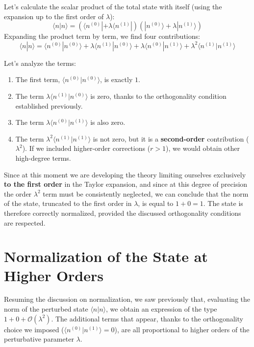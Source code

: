 Let's calculate the scalar product of the total state with itself (using the expansion up to the first order of $\lambda$):
\begin{equation}
\langle n | n \rangle = \left( \langle n^{(0)}| + \lambda \langle n^{(1)}| \right) \left( |n^{(0)}\rangle + \lambda |n^{(1)}\rangle \right)
\end{equation}
Expanding the product term by term, we find four contributions:
\begin{equation}
\langle n | n \rangle = \langle n^{(0)} | n^{(0)} \rangle + \lambda \langle n^{(1)} | n^{(0)} \rangle + \lambda \langle n^{(0)} | n^{(1)} \rangle + \lambda^2 \langle n^{(1)} | n^{(1)} \rangle
\end{equation}

Let's analyze the terms:
\begin{enumerate}
\item The first term, $\langle n^{(0)} \vert{} n^{(0)} \rangle$, is exactly $1$.
\item The term $\lambda \langle n^{(1)} \vert{} n^{(0)} \rangle$ is zero, thanks to the orthogonality condition established previously.
\item The term $\lambda \langle n^{(0)} \vert{} n^{(1)} \rangle$ is also zero.
\item The term $\lambda^2 \langle n^{(1)} \vert{} n^{(1)} \rangle$ is not zero, but it is a \textbf{second-order} contribution ($\lambda^2$). If we included higher-order corrections ($r>1$), we would obtain other high-degree terms.
\end{enumerate}

Since at this moment we are developing the theory limiting ourselves exclusively \textbf{to the first order} in the Taylor expansion, and since at this degree of precision the order $\lambda^2$ term must be consistently neglected, we can conclude that the norm of the state, truncated to the first order in $\lambda$, is equal to $1 + 0 = 1$. The state is therefore correctly normalized, provided the discussed orthogonality conditions are respected.
    

\section{Normalization of the State at Higher Orders}

Resuming the discussion on normalization, we saw previously that, evaluating the norm of the perturbed state $\langle n \vert{} n \rangle$, we obtain an expression of the type $1 + 0 + \mathcal{O}(\lambda^2)$.
The additional terms that appear, thanks to the orthogonality choice we imposed ($\langle n^{(0)} \vert{} n^{(1)} \rangle = 0$), are all proportional to higher orders of the perturbative parameter $\lambda$.

